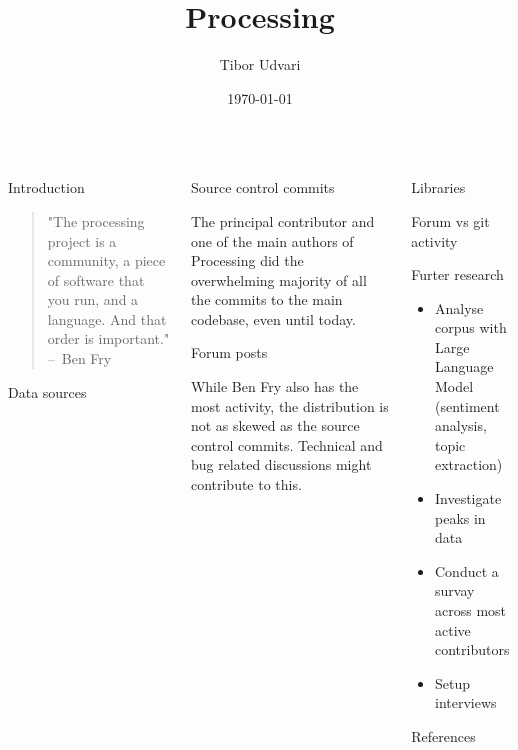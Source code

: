 \documentclass[final]{beamer}
\title{Processing}
\author{Tibor Udvari}
\institute{HEAD – Genève}
\date{\today}
\begin{document}
\begin{frame}[t]
  \begin{columns}[t]
    \begin{column}{.32\textwidth}
      \begin{block}{Introduction}
        \begin{quote}
          "The processing project is a community, a piece of software that you run, and a language. And that order is important." – Ben Fry \parencite[19:22]{artsatmit2017CASTSymposium2017}
          \end{quote}
      \end{block}
      \begin{block}{Data sources}
                
      \end{block}
    \end{column}
    \begin{column}{.32\textwidth}
      \begin{block}{Source control commits}
        
        The principal contributor and one of the main authors of Processing did the overwhelming majority of all the commits to the main codebase, even until today.
      \end{block}
      \begin{block}{Forum posts}
        
        While Ben Fry also has the most activity, the distribution is not as skewed as the source control commits. Technical and bug related discussions might contribute to this.
      \end{block}
    \end{column}
    \begin{column}{.32\textwidth}
      \begin{block}{Libraries}
        
      \end{block}
      \begin{block}{Forum vs git activity}
        
      \end{block}
      \begin{block}{Furter research}
        \begin{itemize}
          \item Analyse corpus with Large Language Model (sentiment analysis, topic extraction)
          \item Investigate peaks in data
          \item Conduct a survay across most active contributors
          \item Setup interviews 
        \end{itemize}
      \end{block}

      \begin{block}{References}
        \printbibliography
      \end{block}
    \end{column}
    
  \end{columns}
\end{frame}
\end{document}
